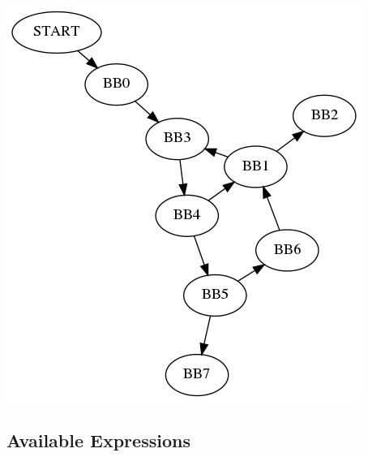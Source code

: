 \documentclass[12pt]{article}
\begin{document}
\begin{minipage}[b]{0.5\linewidth}
\centering


\includegraphics[scale=.3]{prob_51_cfg.png}


\label{fig:figure2}
\end{minipage}







\subsection{Available Expressions}
\end{document}
